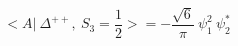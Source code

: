 \begin{equation}
<A|~\Delta^{++}, ~S_3=\frac{1}{2} >= -\frac{\sqrt{6}}{\pi} ~\psi_1^2~\psi_2^*
\end{equation}

